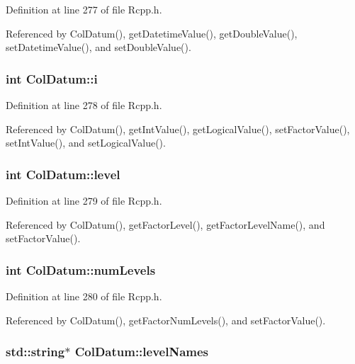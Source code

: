 Definition at line 277 of file Rcpp.h.

Referenced by ColDatum(), getDatetimeValue(), getDoubleValue(), setDatetimeValue(), and setDoubleValue().\hypertarget{classColDatum_4ceff4204e29f345957cb5544f40104f}{
\subsubsection[i]{\setlength{\rightskip}{0pt plus 5cm}int {\bf ColDatum::i}}}
\label{classColDatum_4ceff4204e29f345957cb5544f40104f}




Definition at line 278 of file Rcpp.h.

Referenced by ColDatum(), getIntValue(), getLogicalValue(), setFactorValue(), setIntValue(), and setLogicalValue().\hypertarget{classColDatum_7b0fc92a094e9d1a865fd84c939170d0}{
\subsubsection[level]{\setlength{\rightskip}{0pt plus 5cm}int {\bf ColDatum::level}}}
\label{classColDatum_7b0fc92a094e9d1a865fd84c939170d0}




Definition at line 279 of file Rcpp.h.

Referenced by ColDatum(), getFactorLevel(), getFactorLevelName(), and setFactorValue().\hypertarget{classColDatum_42954a262993eee014db2d1fd7a7c34f}{
\subsubsection[numLevels]{\setlength{\rightskip}{0pt plus 5cm}int {\bf ColDatum::numLevels}}}
\label{classColDatum_42954a262993eee014db2d1fd7a7c34f}




Definition at line 280 of file Rcpp.h.

Referenced by ColDatum(), getFactorNumLevels(), and setFactorValue().\hypertarget{classColDatum_2abac3c574e1ab36531b03849197f779}{
\subsubsection[levelNames]{\setlength{\rightskip}{0pt plus 5cm}std::string$\ast$ {\bf ColDatum::levelNames}}}
\label{classColDatum_2abac3c574e1ab36531b03849197f779}




